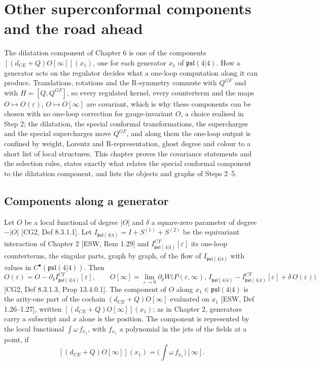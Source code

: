\chapter{Other superconformal components and the road ahead}

The dilatation component of Chapter 6 is one of the components $[(d_{CE}+Q)O[\infty]](x_1)$, one for each generator $x_1$ of $\mathfrak{psl}(4|4)$. How a generator acts on the regulator decides what a one-loop computation along it can produce. Translations, rotations and the R-symmetry commute with $Q^{GF}$ and with $H=[Q,Q^{GF}]$, so every regulated kernel, every counterterm and the maps $O\mapsto O(\varepsilon)$, $O\mapsto O[\infty]$ are covariant, which is why these components can be chosen with no one-loop correction for gauge-invariant $O$, a choice realised in Step 2; the dilatation, the special conformal transformations, the supercharges and the special supercharges move $Q^{GF}$, and along them the one-loop output is confined by weight, Lorentz and R-representation, ghost degree and colour to a short list of local structures. This chapter proves the covariance statements and the selection rules, states exactly what relates the special conformal component to the dilatation component, and lists the objects and graphs of Steps 2--5.

\section{Components along a generator}

\begin{definition}
\label{def:c7-component}
Let $O$ be a local functional of degree $|O|$ and $\delta$ a square-zero parameter of degree $-|O|$ [CG2, Def 8.3.1.1]. Let $I_{\mathfrak{psl}(4|4)}=I+S^{(1)}+S^{(2)}$ be the equivariant interaction of Chapter 2 [ESW, Rem 1.29] and $I^{CT}_{\mathfrak{psl}(4|4)}[\varepsilon]$ its one-loop counterterms, the singular parts, graph by graph, of the flow of $I_{\mathfrak{psl}(4|4)}$ with values in $C^\bullet(\mathfrak{psl}(4|4))$. Then
\[
O(\varepsilon)=O-\partial_\delta I^{CT}_{\mathfrak{psl}(4|4)}[\varepsilon],\qquad O[\infty]=\lim_{\varepsilon\to0}\partial_\delta W\big(P(\varepsilon,\infty),\,I_{\mathfrak{psl}(4|4)}-I^{CT}_{\mathfrak{psl}(4|4)}[\varepsilon]+\delta\,O(\varepsilon)\big)
\]
[CG2, Def 8.3.1.3, Prop 13.4.0.1]. The component of $O$ along $x_1\in\mathfrak{psl}(4|4)$ is the arity-one part of the cochain $(d_{CE}+Q)O[\infty]$ evaluated on $x_1$ [ESW, Def 1.26--1.27], written $[(d_{CE}+Q)O[\infty]](x_1)$; as in Chapter 2, generators carry a subscript and $x$ alone is the position. The component is represented by the local functional $\int\omega\,f_{x_1}$, with $f_{x_1}$ a polynomial in the jets of the fields at a point, if
\[
[(d_{CE}+Q)O[\infty]](x_1)=\Big(\int\omega\,f_{x_1}\Big)[\infty].
\]
\end{definition}

